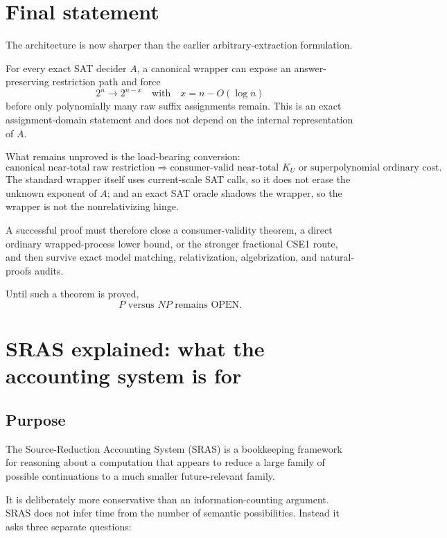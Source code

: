 \documentclass[11pt]{article}
\theoremstyle{plain}
\theoremstyle{definition}
\theoremstyle{remark}
\begin{document}
\section{Final statement}

\begin{statusbox}
The architecture is now sharper than the earlier arbitrary-extraction
formulation.

For every exact SAT decider \(A\), a canonical wrapper can expose an
answer-preserving restriction path and force
\[
2^n\to2^{n-x}
\quad\text{with}\quad
x=n-O(\log n)
\]
before only polynomially many raw suffix assignments remain.  This is an
exact assignment-domain statement and does not depend on the internal
representation of \(A\).

What remains unproved is the load-bearing conversion:
\[
\boxed{
\text{canonical near-total raw restriction}
\Longrightarrow
\text{consumer-valid near-total }K_U
\text{ or superpolynomial ordinary cost}.
}
\]
The standard wrapper itself uses current-scale SAT calls, so it does not erase
the unknown exponent of \(A\); and an exact SAT oracle shadows the wrapper, so
the wrapper is not the nonrelativizing hinge.

A successful proof must therefore close a consumer-validity theorem, a direct
ordinary wrapped-process lower bound, or the stronger fractional CSE1 route,
and then survive exact model matching, relativization, algebrization, and
natural-proofs audits.

Until such a theorem is proved,
\[
\boxed{\text{$P$ versus $NP$ remains OPEN.}}
\]
\end{statusbox}

\appendix

\section{SRAS explained: what the accounting system is for}

\subsection{Purpose}

The Source-Reduction Accounting System (SRAS) is a bookkeeping framework for
reasoning about a computation that appears to reduce a large family of
possible continuations to a much smaller future-relevant family.

It is deliberately more conservative than an information-counting argument.
SRAS does not infer time from the number of semantic possibilities. Instead it
asks three separate questions:
\end{document}
